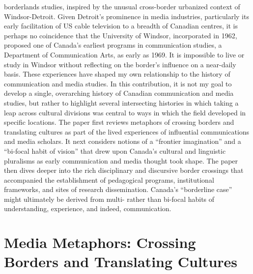 \documentclass{tufte-handout}
\begin{document}
borderlands studies, inspired by the unusual cross-border urbanized
context of Windsor-Detroit. Given Detroit's prominence in media
industries, particularly its early facilitation of US cable television
to a breadth of Canadian centres, it is perhaps no coincidence that the
University of Windsor, incorporated in 1962, proposed one of Canada's
earliest programs in communication studies, a Department of
Communication Arts, as early as 1969. It is impossible to live or study
in Windsor without reflecting on the border's influence on a near-daily
basis. These experiences have shaped my own relationship to the history
of communication and media studies. In this contribution, it is not my
goal to develop a single, overarching history of Canadian communication
and media studies, but rather to highlight several intersecting
histories in which taking a leap across cultural divisions was central
to ways in which the field developed in specific locations. The paper
first reviews metaphors of crossing borders and translating cultures as
part of the lived experiences of influential communications and media
scholars. It next considers notions of a ``frontier imagination'' and a
``bi-focal habit of vision'' that drew upon Canada's cultural and
linguistic pluralisms as early communication and media thought took
shape. The paper then dives deeper into the rich disciplinary and
discursive border crossings that accompanied the establishment of
pedagogical programs, institutional frameworks, and sites of research
dissemination. Canada's ``borderline case'' might ultimately be derived
from multi- rather than bi-focal habits of understanding, experience,
and indeed, communication.

\hypertarget{media-metaphors-crossing-borders-and-translating-cultures}{%
\section{Media Metaphors: Crossing Borders and Translating
Cultures}\label{media-metaphors-crossing-borders-and-translating-cultures}}
\end{document}
